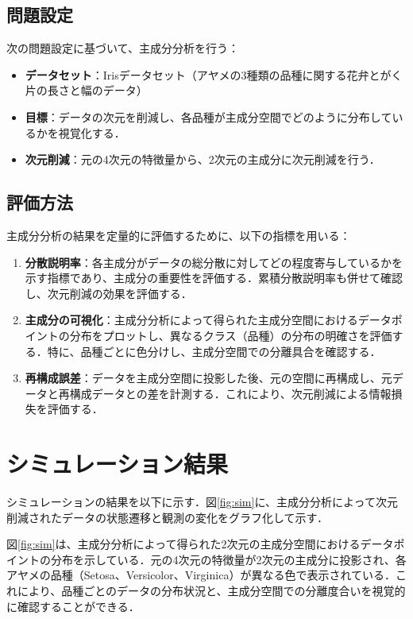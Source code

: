 \documentclass[dvipdfmx,titlepage,a4j]{jsarticle}
\begin{document}
\subsection{問題設定}

次の問題設定に基づいて、主成分分析を行う：

\begin{itemize}
    \item \textbf{データセット}：Irisデータセット（アヤメの3種類の品種に関する花弁とがく片の長さと幅のデータ）
    \item \textbf{目標}：データの次元を削減し、各品種が主成分空間でどのように分布しているかを視覚化する．
    \item \textbf{次元削減}：元の4次元の特徴量から、2次元の主成分に次元削減を行う．
\end{itemize}

\subsection{評価方法}

主成分分析の結果を定量的に評価するために、以下の指標を用いる：

\begin{enumerate}
    \item \textbf{分散説明率}：各主成分がデータの総分散に対してどの程度寄与しているかを示す指標であり、主成分の重要性を評価する．累積分散説明率も併せて確認し、次元削減の効果を評価する．
    \item \textbf{主成分の可視化}：主成分分析によって得られた主成分空間におけるデータポイントの分布をプロットし、異なるクラス（品種）の分布の明確さを評価する．特に、品種ごとに色分けし、主成分空間での分離具合を確認する．
    \item \textbf{再構成誤差}：データを主成分空間に投影した後、元の空間に再構成し、元データと再構成データとの差を計測する．これにより、次元削減による情報損失を評価する．
\end{enumerate}

\section{シミュレーション結果}

シミュレーションの結果を以下に示す．図\ref{fig:sim}に、主成分分析によって次元削減されたデータの状態遷移と観測の変化をグラフ化して示す．

図\ref{fig:sim}は、主成分分析によって得られた2次元の主成分空間におけるデータポイントの分布を示している．元の4次元の特徴量が2次元の主成分に投影され、各アヤメの品種（Setosa、Versicolor、Virginica）が異なる色で表示されている．これにより、品種ごとのデータの分布状況と、主成分空間での分離度合いを視覚的に確認することができる．
\end{document}
